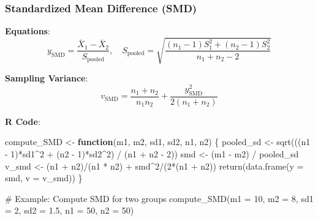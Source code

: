 \documentclass[
  letterpaper,
  DIV=11,
  numbers=noendperiod]{scrartcl}
\newenvironment{Shaded}{\begin{snugshade}}{\end{snugshade}}
\newcommand{\AttributeTok}[1]{\textcolor[rgb]{0.40,0.45,0.13}{#1}}
\newcommand{\CommentTok}[1]{\textcolor[rgb]{0.37,0.37,0.37}{#1}}
\newcommand{\ControlFlowTok}[1]{\textcolor[rgb]{0.00,0.23,0.31}{\textbf{#1}}}
\newcommand{\DecValTok}[1]{\textcolor[rgb]{0.68,0.00,0.00}{#1}}
\newcommand{\FloatTok}[1]{\textcolor[rgb]{0.68,0.00,0.00}{#1}}
\newcommand{\FunctionTok}[1]{\textcolor[rgb]{0.28,0.35,0.67}{#1}}
\newcommand{\NormalTok}[1]{\textcolor[rgb]{0.00,0.23,0.31}{#1}}
\newcommand{\OtherTok}[1]{\textcolor[rgb]{0.00,0.23,0.31}{#1}}
\newcommand{\SpecialCharTok}[1]{\textcolor[rgb]{0.37,0.37,0.37}{#1}}
\begin{document}
\subsubsection{Standardized Mean Difference
(SMD)}\label{standardized-mean-difference-smd}

\textbf{Equations}: \[
y_{\text{SMD}} = \frac{\bar{X}_1 - \bar{X}_2}{S_{\text{pooled}}}, \quad 
S_{\text{pooled}} = \sqrt{\frac{(n_1-1)S_1^2 + (n_2-1)S_2^2}{n_1 + n_2 - 2}}
\]

\textbf{Sampling Variance}: \[
v_{\text{SMD}} = \frac{n_1 + n_2}{n_1 n_2} + \frac{y_{\text{SMD}}^2}{2(n_1 + n_2)}
\]

\textbf{R Code}:

\begin{Shaded}
\begin{Highlighting}[]
\NormalTok{compute\_SMD }\OtherTok{\textless{}{-}} \ControlFlowTok{function}\NormalTok{(m1, m2, sd1, sd2, n1, n2) \{}
\NormalTok{  pooled\_sd }\OtherTok{\textless{}{-}} \FunctionTok{sqrt}\NormalTok{(((n1 }\SpecialCharTok{{-}} \DecValTok{1}\NormalTok{)}\SpecialCharTok{*}\NormalTok{sd1}\SpecialCharTok{\^{}}\DecValTok{2} \SpecialCharTok{+}\NormalTok{ (n2 }\SpecialCharTok{{-}} \DecValTok{1}\NormalTok{)}\SpecialCharTok{*}\NormalTok{sd2}\SpecialCharTok{\^{}}\DecValTok{2}\NormalTok{) }\SpecialCharTok{/}\NormalTok{ (n1 }\SpecialCharTok{+}\NormalTok{ n2 }\SpecialCharTok{{-}} \DecValTok{2}\NormalTok{))}
\NormalTok{  smd }\OtherTok{\textless{}{-}}\NormalTok{ (m1 }\SpecialCharTok{{-}}\NormalTok{ m2) }\SpecialCharTok{/}\NormalTok{ pooled\_sd}
\NormalTok{  v\_smd }\OtherTok{\textless{}{-}}\NormalTok{ (n1 }\SpecialCharTok{+}\NormalTok{ n2)}\SpecialCharTok{/}\NormalTok{(n1 }\SpecialCharTok{*}\NormalTok{ n2) }\SpecialCharTok{+}\NormalTok{ smd}\SpecialCharTok{\^{}}\DecValTok{2}\SpecialCharTok{/}\NormalTok{(}\DecValTok{2}\SpecialCharTok{*}\NormalTok{(n1 }\SpecialCharTok{+}\NormalTok{ n2))}
  \FunctionTok{return}\NormalTok{(}\FunctionTok{data.frame}\NormalTok{(}\AttributeTok{y =}\NormalTok{ smd, }\AttributeTok{v =}\NormalTok{ v\_smd))}
\NormalTok{\}}

\CommentTok{\# Example: Compute SMD for two groups}
\FunctionTok{compute\_SMD}\NormalTok{(}\AttributeTok{m1 =} \DecValTok{10}\NormalTok{, }\AttributeTok{m2 =} \DecValTok{8}\NormalTok{, }\AttributeTok{sd1 =} \DecValTok{2}\NormalTok{, }\AttributeTok{sd2 =} \FloatTok{1.5}\NormalTok{, }\AttributeTok{n1 =} \DecValTok{50}\NormalTok{, }\AttributeTok{n2 =} \DecValTok{50}\NormalTok{)}
\end{Highlighting}
\end{Shaded}
\end{document}
